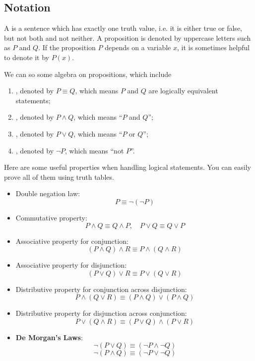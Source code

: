 \subsection{Notation}
A  is a sentence which has exactly one truth value, i.e. it is either true or false, but not both and not neither. A proposition is denoted by uppercase letters such as $P$ and $Q$. If the proposition $P$ depends on a variable $x$, it is sometimes helpful to denote it by $P(x)$. 

We can so some algebra on propositions, which include
\begin{enumerate}[label=(\roman*)]
\item {}, denoted by $P \equiv Q$, which means $P$ and $Q$ are logically equivalent statements;

\item {}, denoted by $P \land Q$, which means ``$P$ and $Q$'';

\item {}, denoted by $P \lor Q$, which means ``$P$ or $Q$'';

\item {}, denoted by $\lnot P$, which means ``not $P$''.
\end{enumerate}

Here are some useful properties when handling logical statements. You can easily prove all of them using truth tables.
\begin{itemize}
\item Double negation law:
\[ P \equiv \lnot(\lnot P) \]

\item Commutative property:
\[ P \land Q \equiv Q \land P, \quad P \lor Q \equiv Q \lor P \]

\item Associative property for conjunction: 
\[ (P\land Q)\land R \equiv P\land (Q\land R) \]

\item Associative property for disjunction: 
\[ (P\lor Q)\lor R \equiv P\lor (Q\lor R) \]

\item Distributive property for conjunction across disjunction: 
\[ P\land(Q\lor R) \equiv (P\land Q)\lor(P\land Q) \]

\item Distributive property for disjunction across conjunction: 
\[ P\lor(Q\land R) \equiv (P\lor Q)\land(P\lor R) \]

\item \textbf{De Morgan's Laws}:
\[ \lnot(P \lor Q) \equiv (\lnot P \land \lnot Q) \]
\[ \lnot (P\land Q) \equiv (\lnot P\lor \lnot Q) \]
\end{itemize}

